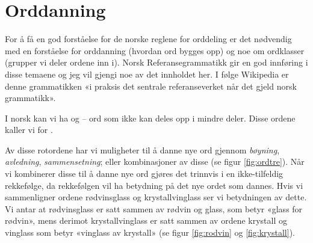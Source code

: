 \chapter{Orddanning}
\label{sec:orddanning}

For å få en god forståelse for de norske reglene for orddeling er det nødvendig med en forståelse for orddanning (hvordan ord bygges opp) og noe om ordklasser (grupper vi deler ordene inn i). Norsk Referansegrammatikk \cite{faarlund1997norsk} gir en god innføring i disse temaene og jeg vil gjengi noe av det innholdet her. I følge Wikipedia \cite{wiki-nrg} er denne grammatikken «i praksis det sentrale referanseverket når det gjeld norsk grammatikk».

\begin{center}
{\huge\color{gray!50}{\decofourleft}}
\end{center}

I norsk kan vi ha  og  -- ord som ikke kan deles opp i mindre deler. Disse ordene kaller vi for . 


Av disse rotordene har vi muligheter til å danne nye ord gjennom \textit{bøyning}, \textit{avledning}, \textit{sammensetning}; eller kombinasjoner av disse (se figur \ref{fig:ordtre}). 
Når vi kombinerer disse til å danne nye ord gjøres det trinnvis i en ikke-tilfeldig rekkefølge, da rekkefølgen vil ha betydning på det nye ordet som dannes. Hvis vi sammenligner ordene rødvinsglass og krystallvinglass ser vi betydningen av dette. Vi antar at rødvinsglass er satt sammen av rødvin og glass, som betyr «glass for rødvin», mens derimot krystallvinglass er satt sammen av ordene krystall og vinglass som betyr «vinglass av krystall» (se figur \ref{fig:rodvin} og \ref{fig:krystall}).



